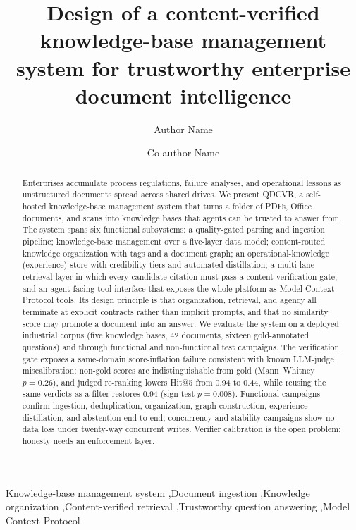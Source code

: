 \documentclass[preprint,12pt]{elsarticle}
\begin{document}
\begin{frontmatter}

\title{Design of a content-verified knowledge-base management system for
trustworthy enterprise document intelligence}

\author[inst1]{Author Name}
\author[inst1]{Co-author Name}

\begin{abstract}
Enterprises accumulate process regulations, failure analyses, and operational
lessons as unstructured documents spread across shared drives. We present
QDCVR, a self-hosted knowledge-base management system that turns a folder of
PDFs, Office documents, and scans into knowledge bases that agents can be
trusted to answer from. The system spans six functional subsystems: a
quality-gated parsing and ingestion pipeline; knowledge-base management over a
five-layer data model; content-routed knowledge organization with tags and a
document graph; an operational-knowledge (experience) store with credibility
tiers and automated distillation; a multi-lane retrieval layer in which every
candidate citation must pass a content-verification gate; and an agent-facing
tool interface that exposes the whole platform as Model Context Protocol
tools. Its design principle is that organization, retrieval, and agency all
terminate at explicit contracts rather than implicit prompts, and that no
similarity score may promote a document into an answer. We evaluate the system
on a deployed industrial corpus (five knowledge bases, 42 documents, sixteen
gold-annotated questions) and through functional and non-functional test
campaigns. The verification gate exposes a same-domain score-inflation failure
consistent with known LLM-judge miscalibration: non-gold scores are
indistinguishable from gold (Mann--Whitney $p = 0.26$), and judged re-ranking
lowers Hit@5 from 0.94 to 0.44, while reusing the same verdicts as a filter
restores 0.94 (sign test $p = 0.008$). Functional campaigns confirm ingestion,
deduplication, organization, graph construction, experience distillation, and
abstention end to end; concurrency and stability campaigns show no data loss
under twenty-way concurrent writes. Verifier calibration is the open problem;
honesty needs an enforcement layer.
\end{abstract}

\begin{keyword}
Knowledge-base management system \sep Document ingestion \sep Knowledge
organization \sep Content-verified retrieval \sep Trustworthy question
answering \sep Model Context Protocol
\end{keyword}

\end{frontmatter}

\end{document}
